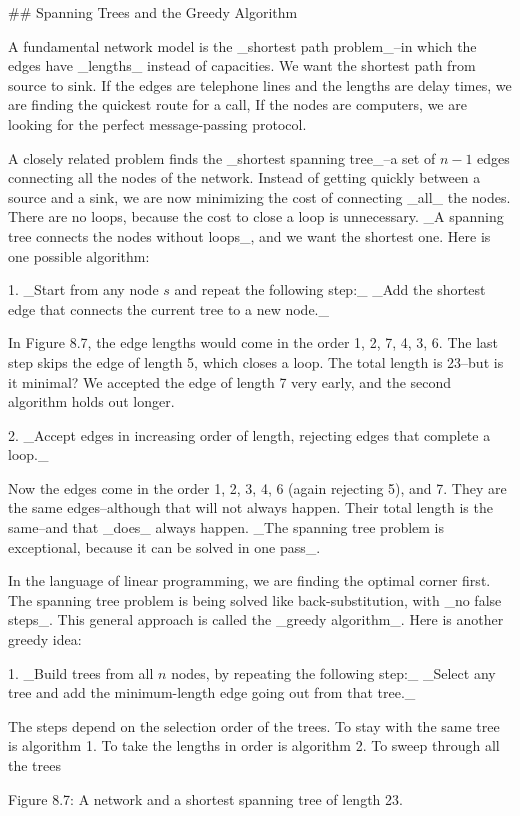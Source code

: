 

## Spanning Trees and the Greedy Algorithm

A fundamental network model is the _shortest path problem_--in which the edges have _lengths_ instead of capacities. We want the shortest path from source to sink. If the edges are telephone lines and the lengths are delay times, we are finding the quickest route for a call, If the nodes are computers, we are looking for the perfect message-passing protocol.

A closely related problem finds the _shortest spanning tree_--a set of \(n-1\) edges connecting all the nodes of the network. Instead of getting quickly between a source and a sink, we are now minimizing the cost of connecting _all_ the nodes. There are no loops, because the cost to close a loop is unnecessary. _A spanning tree connects the nodes without loops_, and we want the shortest one. Here is one possible algorithm:

1. _Start from any node \(s\) and repeat the following step:_ _Add the shortest edge that connects the current tree to a new node._

In Figure 8.7, the edge lengths would come in the order 1, 2, 7, 4, 3, 6. The last step skips the edge of length 5, which closes a loop. The total length is 23--but is it minimal? We accepted the edge of length 7 very early, and the second algorithm holds out longer.

2. _Accept edges in increasing order of length, rejecting edges that complete a loop._

Now the edges come in the order 1, 2, 3, 4, 6 (again rejecting 5), and 7. They are the same edges--although that will not always happen. Their total length is the same--and that _does_ always happen. _The spanning tree problem is exceptional, because it can be solved in one pass_.

In the language of linear programming, we are finding the optimal corner first. The spanning tree problem is being solved like back-substitution, with _no false steps_. This general approach is called the _greedy algorithm_. Here is another greedy idea:

1. _Build trees from all \(n\) nodes, by repeating the following step:_ _Select any tree and add the minimum-length edge going out from that tree._

The steps depend on the selection order of the trees. To stay with the same tree is algorithm 1. To take the lengths in order is algorithm 2. To sweep through all the trees

Figure 8.7: A network and a shortest spanning tree of length 23.

